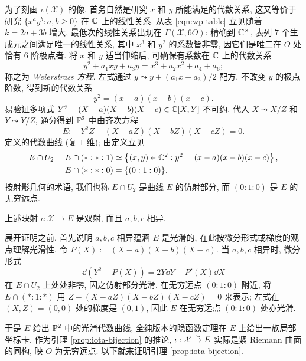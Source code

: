 为了刻画 $\iota(\mathcal{X})$ 的像, 首务自然是研究 $x$ 和 $y$ 所能满足的代数关系, 这又等价于研究 $\{ x^a y^b : a,b \geq 0 \}$ 在 $\mathbb{C}$ 上的线性关系. 从表 \eqref{eqn:wp-table} 立见随着 $k = 2a+3b$ 增大, 最低次的线性关系出现在 $\Gamma(\mathcal{X}, 6 O)$: 精确到 $\mathbb{C}^\times$, 表列 $7$ 个生成元之间满足唯一的线性关系, 其中 $x^3$ 和 $y^2$ 的系数皆非零, 因它们是唯二在 $O$ 处恰有 $6$ 阶极点者. 将 $x$ 和 $y$ 适当伸缩后, 可确保有系数在 $\mathbb{C}$ 上的代数关系 
\begin{equation}\label{eqn:elliptic-Weierstrass}
	y^2 + a_1 xy + a_3 y = x^3 + a_2 x^2 + a_4 + a_6;
\end{equation}
称之为 \emph{Weierstrass 方程}. 左式通过 $y \leadsto y + (a_1 x + a_3)/2$ 配方, 不改变 $y$ 的极点阶数, 得到新的代数关系
\begin{equation}\label{eqn:elliptic-abc}
	y^2 = (x-a)(x-b)(x-c).
\end{equation}
易验证多项式 $Y^2 - (X-a)(X-b)(X-c) \in \mathbb{C}[X, Y]$ 不可约. 代入 $X \leadsto X/Z$ 和 $Y \leadsto Y/Z$, 通分得到 $\mathbb{P}^2$ 中由齐次方程
\[ E: \quad Y^2 Z - (X-aZ)(X-bZ)(X-cZ) = 0. \]
定义的代数曲线 (复 $1$ 维); 由定义立见
\begin{align*}
	E \cap U_2 = E \cap (*:*:1) & \simeq \left\{ (x,y) \in \mathbb{C}^2: y^2 = (x-a)(x-b)(x-c) \right\}, \\
	E \cap (*:*:0) & = \{(0:1:0)\}.
\end{align*}
按射影几何的术语, 我们也称 $E \cap U_2$ 是曲线 $E$ 的仿射部分, 而 $(0:1:0)$ 是 $E$ 的无穷远点.

\begin{lemma}\label{prop:iota-bijection}
	上述映射 $\iota: \mathcal{X} \to E$ 是双射, 而且 $a,b,c$ 相异.
\end{lemma}

展开证明之前, 首先说明 $a,b,c$ 相异蕴涵 $E$ 是光滑的, 在此按微分形式或梯度的观点理解光滑性. 令 $P(X) := (X-a)(X-b)(X-c)$. 当 $a,b,c$ 相异时, 微分形式
\[ \dd (Y^2 - P(X)) = 2Y \dd Y - P'(X) \dd X \]
在 $E \cap U_2$ 上处处非零, 因之仿射部分光滑. 在无穷远点 $(0:1:0)$ 附近, 将 $E \cap (*:1:*)$ 用 $Z - (X-aZ)(X-bZ)(X-cZ) = 0$ 来表示; 左式在 $(X,Z)=(0,0)$ 处的梯度是 $(0,1)$, 因此 $E$ 在无穷远点 $(0:1:0)$ 处亦光滑.

于是 $E$ 给出 $\mathbb{P}^2$ 中的光滑代数曲线, 全纯版本的隐函数定理在 $E$ 上给出一族局部坐标卡. 作为引理 \ref{prop:iota-bijection} 的推论, $\iota: \mathcal{X} \stackrel{\sim}{\rightarrow} E$ 实际是紧 Riemann 曲面的同构, 映 $O$ 为无穷远点. 以下就来证明引理 \ref{prop:iota-bijection}.

